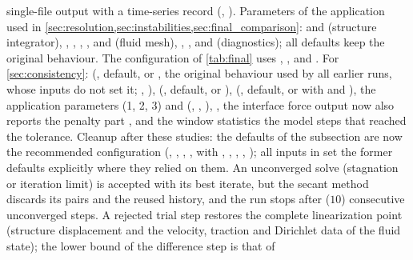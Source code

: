 \documentclass[11pt,a4paper]{article}
\theoremstyle{definition}
\theoremstyle{remark}
\begin{document}
single-file output with a time-series record (,
). Parameters of the application  used in
\cref{sec:resolution,sec:instabilities,sec:final_comparison}:  and
 (structure integrator), , ,
, ,  and
 (fluid mesh), , ,
 and  (diagnostics); all defaults keep
the original behaviour. The configuration of \cref{tab:final} uses , ,  and .
For \cref{sec:consistency}:  (, default, or ,
the original behaviour used by all earlier runs, whose inputs do not set it;
, ),
 (, default, or ),
 (, default, or
 with  and ), the application
parameters  (1, 2, 3) and  (, ,
), , the interface force output now also
reports the penalty part , and the window statistics the model steps that reached
the tolerance. Cleanup after these studies: the defaults of the subsection 
are now the recommended configuration (,
, ,
,  with
, , ,
, ); all inputs in
 set the former defaults explicitly where they relied on
them. An unconverged solve (stagnation or iteration limit) is accepted with its best iterate, but
the secant method discards its pairs and the reused history, and the run stops after
 ($10$) consecutive unconverged steps. A rejected trial step
restores the complete linearization point (structure displacement and the velocity, traction and
Dirichlet data of the fluid state); the lower bound of the difference step is that of
\end{document}
